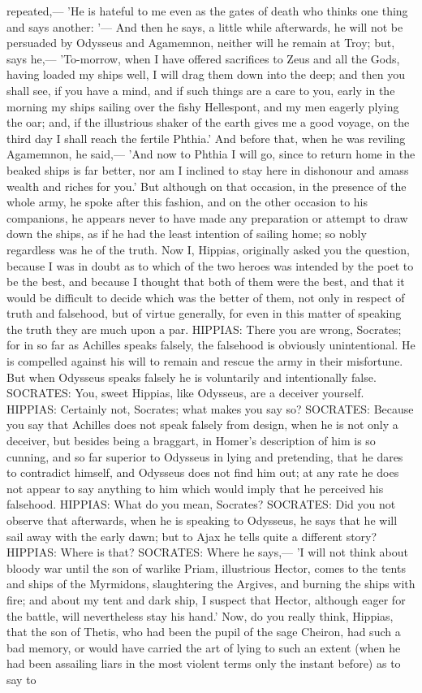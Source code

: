 \documentclass[11pt,letter]{article}
\begin{document}
repeated,— 'He is hateful to me even as the gates of death who thinks one thing and says another: '— And then he says, a little while afterwards, he will not be persuaded by Odysseus and Agamemnon, neither will he remain at Troy; but, says he,— 'To-morrow, when I have offered sacrifices to Zeus and all the Gods, having loaded my ships well, I will drag them down into the deep; and then you shall see, if you have a mind, and if such things are a care to you, early in the morning my ships sailing over the fishy Hellespont, and my men eagerly plying the oar; and, if the illustrious shaker of the earth gives me a good voyage, on the third day I shall reach the fertile Phthia.' And before that, when he was reviling Agamemnon, he said,— 'And now to Phthia I will go, since to return home in the beaked ships is far better, nor am I inclined to stay here in dishonour and amass wealth and riches for you.' But although on that occasion, in the presence of the whole army, he spoke after this fashion, and on the other occasion to his companions, he appears never to have made any preparation or attempt to draw down the ships, as if he had the least intention of sailing home; so nobly regardless was he of the truth. Now I, Hippias, originally asked you the question, because I was in doubt as to which of the two heroes was intended by the poet to be the best, and because I thought that both of them were the best, and that it would be difficult to decide which was the better of them, not only in respect of truth and falsehood, but of virtue generally, for even in this matter of speaking the truth they are much upon a par. HIPPIAS:  There you are wrong, Socrates; for in so far as Achilles speaks falsely, the falsehood is obviously unintentional. He is compelled against his will to remain and rescue the army in their misfortune. But when Odysseus speaks falsely he is voluntarily and intentionally false. SOCRATES:  You, sweet Hippias, like Odysseus, are a deceiver yourself. HIPPIAS:  Certainly not, Socrates; what makes you say so? SOCRATES:  Because you say that Achilles does not speak falsely from design, when he is not only a deceiver, but besides being a braggart, in Homer's description of him is so cunning, and so far superior to Odysseus in lying and pretending, that he dares to contradict himself, and Odysseus does not find him out; at any rate he does not appear to say anything to him which would imply that he perceived his falsehood. HIPPIAS:  What do you mean, Socrates? SOCRATES:  Did you not observe that afterwards, when he is speaking to Odysseus, he says that he will sail away with the early dawn; but to Ajax he tells quite a different story? HIPPIAS:  Where is that? SOCRATES:  Where he says,— 'I will not think about bloody war until the son of warlike Priam, illustrious Hector, comes to the tents and ships of the Myrmidons, slaughtering the Argives, and burning the ships with fire; and about my tent and dark ship, I suspect that Hector, although eager for the battle, will nevertheless stay his hand.' Now, do you really think, Hippias, that the son of Thetis, who had been the pupil of the sage Cheiron, had such a bad memory, or would have carried the art of lying to such an extent (when he had been assailing liars in the most violent terms only the instant before) as to say to 
\end{document}
